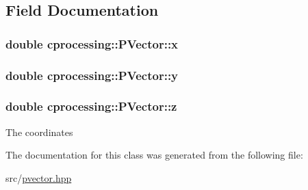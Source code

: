 \subsection{\-Field \-Documentation}
\hypertarget{classcprocessing_1_1PVector_a8cde2eb83b92d0d7b21b335ff6fd62fe}{
\subsubsection[{x}]{\setlength{\rightskip}{0pt plus 5cm}double {\bf cprocessing\-::\-P\-Vector\-::x}}}\label{classcprocessing_1_1PVector_a8cde2eb83b92d0d7b21b335ff6fd62fe}
\hypertarget{classcprocessing_1_1PVector_abb08a1c7f21e21d2c1557d26722a9a02}{
\subsubsection[{y}]{\setlength{\rightskip}{0pt plus 5cm}double {\bf cprocessing\-::\-P\-Vector\-::y}}}\label{classcprocessing_1_1PVector_abb08a1c7f21e21d2c1557d26722a9a02}
\hypertarget{classcprocessing_1_1PVector_a28310efbe3ee03e9d5c01e5869428f70}{
\subsubsection[{z}]{\setlength{\rightskip}{0pt plus 5cm}double {\bf cprocessing\-::\-P\-Vector\-::z}}}\label{classcprocessing_1_1PVector_a28310efbe3ee03e9d5c01e5869428f70}
\-The coordinates 

\-The documentation for this class was generated from the following file\-:\begin{DoxyCompactItemize}
\item 
src/\hyperlink{pvector_8hpp}{pvector.\-hpp}\end{DoxyCompactItemize}
